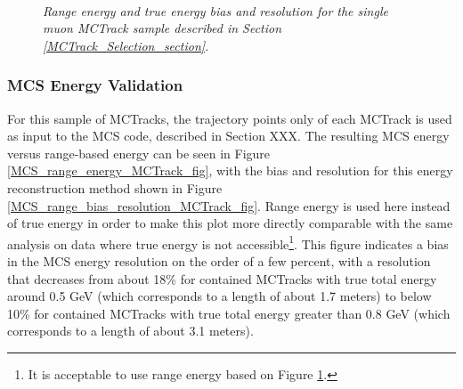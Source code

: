 \begin{figure}
\centering
\mbox{
	\quad
	}
\caption{\textit{Range energy and true energy bias and resolution for the single muon {\sc MCTrack} sample described in Section \ref{MCTrack_Selection_section}.}}
\label{true_range_bias_resolution_MCTrack_fig}
\end{figure}




\subsubsection{MCS Energy Validation}\label{MCS_Energy_Validation_MCTrack_section}
For this sample of {\sc MCTracks}, the trajectory points only of each {\sc MCTrack} is used as input to the MCS code, described in Section XXX. The resulting MCS energy versus range-based energy can be seen in Figure \ref{MCS_range_energy_MCTrack_fig}, with the bias and resolution for this energy reconstruction method shown in Figure \ref{MCS_range_bias_resolution_MCTrack_fig}. Range energy is used here instead of true energy in order to make this plot more directly comparable with the same analysis on data where true energy is not accessible\footnote{It is acceptable to use range energy based on Figure \ref{true_range_bias_resolution_MCTrack_fig}.}. This figure indicates a bias in the MCS energy resolution on the order of a few percent, with a resolution that decreases from about 18\% for contained {\sc MCTracks} with true total energy around 0.5 GeV (which corresponds to a length of about 1.7 meters) to below 10\% for contained {\sc MCTracks} with true total energy greater than 0.8 GeV (which corresponds to a length of about 3.1 meters).


